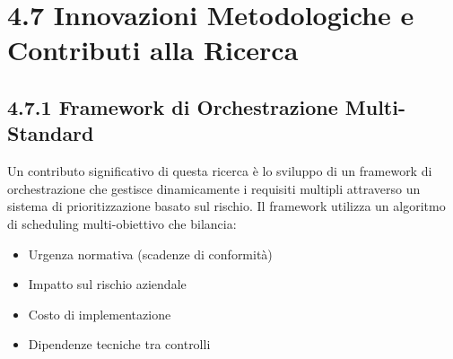 \section{4.7 Innovazioni Metodologiche e Contributi alla Ricerca}

\subsection{4.7.1 Framework di Orchestrazione Multi-Standard}

Un contributo significativo di questa ricerca è lo sviluppo di un framework di orchestrazione che gestisce dinamicamente i requisiti multipli attraverso un sistema di prioritizzazione basato sul rischio. Il framework utilizza un algoritmo di scheduling multi-obiettivo che bilancia:

\begin{itemize}
\item Urgenza normativa (scadenze di conformità)
\item Impatto sul rischio aziendale 
\item Costo di implementazione
\item Dipendenze tecniche tra controlli
\end{itemize}

